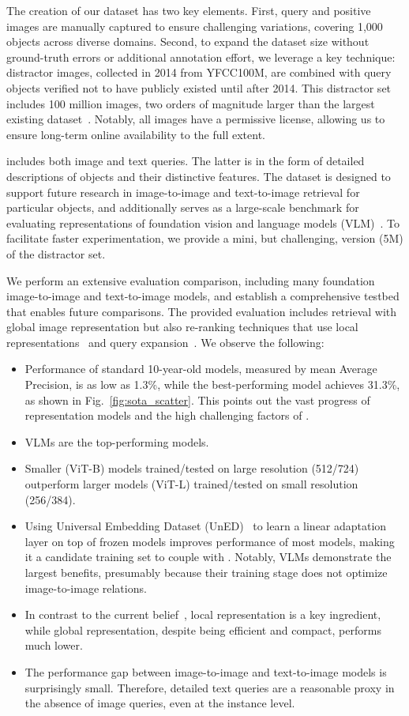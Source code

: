 The creation of our dataset has two key elements. First, query and positive images are manually captured to ensure challenging variations, covering 1,000 objects across diverse domains. 
Second, to expand the dataset size without ground-truth errors or additional annotation effort, we leverage a key technique: distractor images, collected in 2014 from YFCC100M, are combined with query objects verified not to have publicly existed until after 2014. This distractor set includes 100 million images, two orders of magnitude larger than the largest existing dataset~\cite{rit+18}.
Notably, all images have a permissive license, allowing us to ensure long-term online availability to the full extent.

\ours includes both image and text queries. The latter is in the form of detailed descriptions of objects and their distinctive features. 
The dataset is designed to support future research in image-to-image and text-to-image retrieval for particular objects, and additionally serves as a large-scale benchmark for evaluating representations of foundation vision and language models (VLM)~\cite{clip,siglip}. 
To facilitate faster experimentation, we provide a mini, but challenging, version (5M) of the distractor set.

We perform an extensive evaluation comparison, including many foundation image-to-image and text-to-image models, and establish a comprehensive testbed that enables future comparisons.
The provided evaluation includes retrieval with global image representation but also re-ranking techniques that use local representations~\cite{ras+14,pci+07,ski+24} and query expansion~\cite{cps+07,rtc19}.
We observe the following:
\begin{itemize}
\item Performance of standard 10-year-old models, measured by mean Average Precision, is as low as 1.3\%, while the best-performing model achieves 31.3\%, as shown in Fig.~\ref{fig:sota_scatter}. This points out the vast progress of representation models and the high challenging factors of \ours.
\item VLMs are the top-performing models.
\item Smaller (ViT-B) models trained/tested on large resolution (512/724) outperform larger models (ViT-L) trained/tested on small resolution (256/384). 
\item Using Universal Embedding Dataset (UnED)~\cite{ycc+23} to learn a linear adaptation layer on top of frozen models improves performance of most models, making it a candidate training set to couple with \ours. Notably, VLMs demonstrate the largest benefits, presumably because their training stage does not optimize image-to-image relations. 
\item In contrast to the current belief~\cite{sck+23}, local representation is a key ingredient, while global representation, despite being efficient and compact, performs much lower. 
\item The performance gap between image-to-image and text-to-image models is surprisingly small. Therefore, detailed text queries are a reasonable proxy in the absence of image queries, even at the instance level.
\end{itemize}